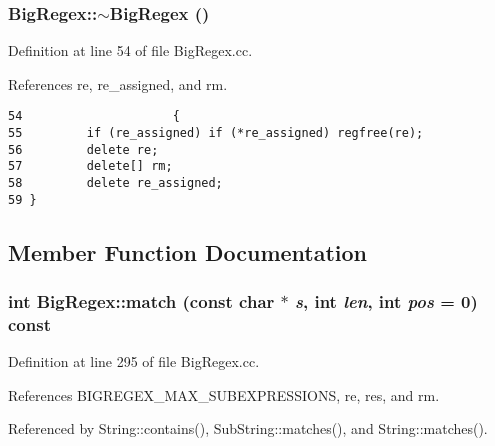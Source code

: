 \subsubsection{\setlength{\rightskip}{0pt plus 5cm}Big\-Regex::$\sim$Big\-Regex ()}\label{classBigRegex_a1}




Definition at line 54 of file Big\-Regex.cc.

References re, re\_\-assigned, and rm.



\footnotesize\begin{verbatim}54                     {
55         if (re_assigned) if (*re_assigned) regfree(re);
56         delete re;
57         delete[] rm;
58         delete re_assigned;
59 }
\end{verbatim}\normalsize 


\subsection{Member Function Documentation}
\subsubsection{\setlength{\rightskip}{0pt plus 5cm}int Big\-Regex::match (const char $\ast$ {\em s}, int {\em len}, int {\em pos} = 0) const}\label{classBigRegex_a2}




Definition at line 295 of file Big\-Regex.cc.

References BIGREGEX\_\-MAX\_\-SUBEXPRESSIONS, re, res, and rm.

Referenced by String::contains(), Sub\-String::matches(), and String::matches().



